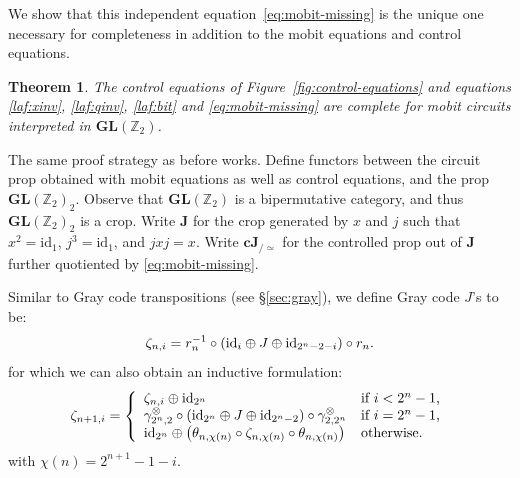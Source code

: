 \documentclass[a4paper]{article}
\theoremstyle{plain}
\newtheorem{theorem}{Theorem}
\theoremstyle{definition}
\newcommand{\cat}[1]{\mathbf{#1}}
\newcommand{\ccat}[1]{\mathbf{c #1}}
\newcommand{\symtimes}{\gamma^\otimes}
\newcommand{\Z}{{\mathbb Z}}
\newcommand{\quo}{_{/\simeq}}
\newcommand{\iid}{\mathrm{id}}
\newcommand{\secref}[1]{\S \ref{#1}}
\begin{document}
We show that this independent equation~\eqref{eq:mobit-missing} is the unique
one necessary for completeness in addition to the mobit equations and control
equations.

\begin{theorem}
	The control equations of Figure~\ref{fig:control-equations} and equations
	\eqref{laf:xinv}, \eqref{laf:qinv}, \eqref{laf:bit} and
	\eqref{eq:mobit-missing} are complete for mobit circuits interpreted in
	$\cat{GL}(\Z_2)$.
\end{theorem}

The same proof strategy as before works. Define functors between the circuit
prop obtained with mobit equations as well as control equations, and the prop
$\cat{GL}(\Z_2)_2$. Observe that $\cat{GL}(\Z_2)$ is a bipermutative
category, and thus $\cat{GL}(\Z_2)_2$ is a crop. Write $\cat
J$ for the crop generated by $x$ and $j$ such that $x^2 = \iid_1$, $j^3 =
\iid_1$, and $jxj = x$. Write $\ccat J\quo$ for the controlled prop out
of $\cat J$ further quotiented by \eqref{eq:mobit-missing}.

Similar to Gray code transpositions (see \secref{sec:gray}), we define Gray
code $J$'s to be:
\[
	\zeta_{n,i} =
	r_n^{-1} \circ (\iid_i \oplus J \oplus \iid_{2^n - 2 - i}) \circ r_n \text.
\]
for which we can also obtain an inductive formulation:
\begin{equation}\label{eq:ind-zeta}
	\zeta_{n+1,i} =
	\left\{
		\begin{array}{ll}
			\zeta_{n,i} \oplus \iid_{2^n} & \text{if } i < 2^n - 1\text, \\
			\symtimes_{2^n,2} \circ (\iid_{2^n} \oplus J \oplus \iid_{2^n-2}) \circ \symtimes_{2,2^n}
			& \text{if } i = 2^n - 1\text, \\
			\iid_{2^n} \oplus \left( \theta_{n,\chi(n)} \circ
			\zeta_{n,\chi(n)} \circ \theta_{n,\chi(n)} \right)
			& \text{otherwise.}
		\end{array}
	\right.
\end{equation}
with $\chi(n) = 2^{n+1} - 1 - i$.
\end{document}

